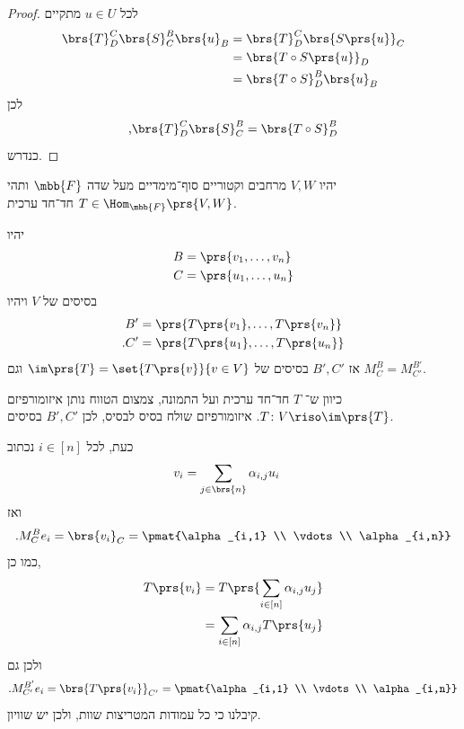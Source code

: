\documentclass[a4paper,10pt,twoside,openany]{book}
\begin{document}
\begin{proof}
לכל
$u \in U$
מתקיים
\begin{align*}
\brs{T}^C_D \brs{S}^B_C \brs{u}_B &= \brs{T}^C_D \brs{S\prs{u}}_C
\\&= \brs{T \circ S \prs{u}}_D
\\&= \brs{T \circ S}^B_D \brs{u}_B
\end{align*}
לכן
\[\text{,} \brs{T}^C_D \brs{S}^B_C = \brs{T \circ S}^B_D\]
כנדרש.
\end{proof}

\begin{proposition} \label{proposition:change-of-basis-through-isomorphism}
יהיו
$V,W$
מרחבים וקטוריים סוף־מימדיים מעל שדה
$\mbb{F}$
ותהי
$T \in \Hom_{\mbb{F}}\prs{V,W}$
חד־חד ערכית.

יהיו
\begin{align*}
B &= \prs{v_1, \ldots, v_n} \\
C &= \prs{u_1, \ldots, u_n}
\end{align*}
בסיסים של
$V$
ויהיו
\begin{align*}
B' &= \prs{T\prs{v_1}, \ldots, T\prs{v_n}} \\
\text{.} C' &= \prs{T\prs{u_1}, \ldots, T\prs{u_n}}
\end{align*}
אז
$B',C'$
בסיסים של
$\im\prs{T} = \set{T\prs{v}}{v \in V}$
וגם
$M^B_C = M^{B'}_{C'}$.
\end{proposition}

\begin{solution}
כיוון ש־%
$T$
חד־חד ערכית ועל התמונה, צמצום הטווח נותן איזומורפיזם
$T \colon V \riso \im\prs{T}$.
איזומורפיזם שולח בסיס לבסיס, לכן
$B',C'$
בסיסים.

כעת, לכל
$i \in [n]$
נכתוב
\begin{align*}
v_i &= \sum_{j \in \brs{n}} \alpha_{i,j} u_i
\end{align*}
ואז
\begin{align*}
\text{.} M^B_C e_i = \brs{v_i}_C = \pmat{\alpha_{i,1} \\ \vdots \\ \alpha_{i,n}}
\end{align*}
כמו כן,
\begin{align*}
T\prs{v_i}
&=
T\prs{\sum_{i \in [n]} \alpha_{i,j} u_j}
\\&=
\sum_{i \in [n]} \alpha_{i,j} T\prs{u_j}
\end{align*}
ולכן גם
\[\text{.} M^{B'}_{C'} e_i = \brs{T\prs{v_i}}_{C'} = \pmat{\alpha_{i,1} \\ \vdots \\ \alpha_{i,n}}\]
קיבלנו כי כל עמודות המטריצות שוות, ולכן יש שוויון.
\end{solution}
\end{document}
